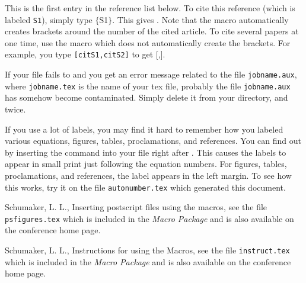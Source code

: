 This is the first entry in the reference list below.
To cite this reference (which is
labeled {\tt S1}), simply type $\{$S1$\}$.
This gives \cite{S1}. Note that the macro  automatically
creates brackets around the number of the cited article.
To cite several papers at one time, use the macro  which
does not automatically create the brackets.  For example,
you type {\tt [\back{}cit\lb{}S1\rb{},\back{}cit\lb{}S2\rb{}]} to get
[,].

If your file fails to \Tex and you get an error message
related to the file {\tt jobname.aux}, where {\tt jobname.tex} is
the name of your tex file, probably the file
{\tt jobname.aux} has somehow become contaminated.
Simply delete it
from your directory, and  twice.

If you use a lot of labels, you may find it hard to remember how
you labeled various equations, figures, tables, proclamations, and
references.
You can find out by inserting the command  into
your \Tex file right after .  This causes the
labels to appear in small print just following the equation numbers.
For figures, tables, proclamations, and references, the label appears
in the left margin.
To see how this works, try it on the file {\tt autonumber.tex} which
generated this document.


\References

Schumaker, L. L., Inserting postscript files
using the \conf macros,
see the \Tex file {\tt psfigures.tex} which is
included in the {\it \conf Macro Package} and is also
available on the conference home page.

Schumaker, L. L.,
Instructions for using the \conf \Tex Macros,
see the \Tex file {\tt instruct.tex} which is
included in the {\it \conf Macro Package} and is also
available on the conference home page.


\bye

